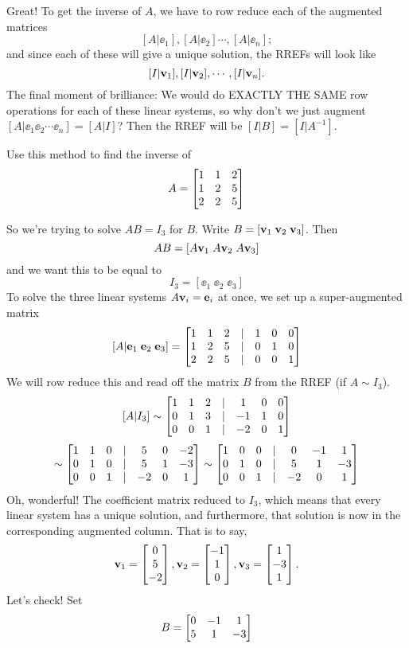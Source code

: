 Great!  To get the inverse of $A$, we have to row reduce each
of the augmented matrices
$$
[A|\ee_1], [A|\ee_2] \cdots , [A|\ee_n];
$$
and since each of these will give a unique solution, the RREFs will
look like
$$
[I|\mathbf{v}_1], [I|\mathbf{v}_2], \cdots, [I|\mathbf{v}_n].
$$
The final moment of brilliance:  We would do EXACTLY THE SAME row
operations for each of these linear systems, so why don't we just
augment $[A|\ee_1 \ee_2 \cdots \ee_n] = [A|I]$?  Then the RREF
will be $[I|B] = [I|A^{-1}]$.  

\begin{myprob}  Use this method to find the inverse of
$$
A = \left[ \begin{matrix} 1 & 1 & 2\\ 1 & 2 & 5\\ 2 & 2 & 5 \end{matrix} \right]
$$

\begin{mysol}  So we're trying to solve $AB = I_3$ for $B$.  Write $B = [ \mathbf{v}_1\; \mathbf{v}_2 \; \mathbf{v}_3]$.  Then
$$
AB = [A\mathbf{v}_1 \; A\mathbf{v}_2\; A\mathbf{v}_3]
$$
and we want this to be equal to 
$$
I_3 = [\ee_1 \; \ee_2\; \ee_3]
$$
To solve the three linear systems $A\mathbf{v}_i = \mathbf{e}_i$ at once, we
set up a super-augmented matrix
$$
[A \vert \mathbf{e}_1 \; \mathbf{e}_2\; \mathbf{e}_3] = 
\left[ \begin{matrix} 
1 & 1 & 2 &|& 1 & 0 & 0\\ 
1 & 2 & 5 &|& 0 & 1 & 0\\ 
2 & 2 & 5 &|& 0 & 0 & 1 \end{matrix} \right]
$$
We will row reduce this and read off the matrix $B$ from the RREF (if
$A\sim I_3$).
$$
[A|I_3] \sim 
\left[ \begin{matrix} 
1 & 1 & 2 &|& 1 & 0 & 0\\ 
0 & 1 & 3 &|& -1 & 1 & 0\\ 
0 & 0 & 1 &|& -2 & 0 & 1 \end{matrix} \right]
$$
$$
\sim \left[ \begin{matrix} 
1 & 1 & 0 &|& 5 & 0 & -2\\ 
0 & 1 & 0 &|& 5 & 1 & -3\\ 
0 & 0 & 1 &|& -2 & 0 & 1 \end{matrix} \right]
\sim
\left[ \begin{matrix} 
1 & 0 & 0 &|& 0 & -1 & 1\\ 
0 & 1 & 0 &|& 5 & 1 & -3\\ 
0 & 0 & 1 &|& -2 & 0 & 1 \end{matrix} \right]
$$
Oh, wonderful!  The coefficient matrix reduced to $I_3$, which 
means that every linear system has a unique solution, and furthermore,
that solution is now in the corresponding augmented column.  That is
to say, 
$$
\mathbf{v}_1 = \left[ \begin{matrix} 0\\5\\-2 \end{matrix} \right], \mathbf{v}_2=\left[ \begin{matrix} -1\\1\\0 \end{matrix} \right], \mathbf{v}_3=\left[ \begin{matrix} 1\\-3\\1 \end{matrix} \right].
$$
Let's check!  Set 
$$
B = \left[ \begin{matrix} 0 & -1 & 1\\ 
 5 & 1 & -3\\ 
 \end{matrix} \right]$$
\end{mysol}
\end{myprob}
